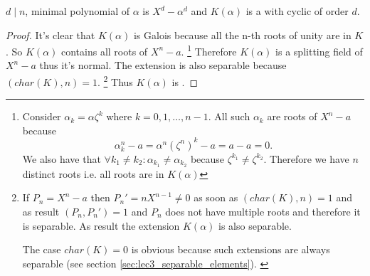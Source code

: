\begin{proposition}
  $d \mid n$, minimal polynomial of $\alpha$ is $X^d - \alpha^d$ and
  $K\left(\alpha\right)$ is a  with
  cyclic  of order $d$.
  \label{prop:lec7_1}
  \begin{proof}
    It's clear that $K\left(\alpha\right)$ is Galois because all the
    n-th roots of unity are in $K$. So $K\left(\alpha\right)$
    contains all roots of $X^n - a$.
    \footnote{
      Consider $\alpha_k = \alpha \zeta^k$ where
      $k = 0,1, \dots, n - 1$. All such $\alpha_k$ are roots of
      $X^n - a$ because
      \[
      \alpha_k^n - a = \alpha^n \left(\zeta^n\right)^k - a = a - a =0.
      \]
      We also have that $\forall k_1 \ne k_2: \alpha_{k_1} \ne
      \alpha_{k_2}$ because $\zeta^{k_1} \ne \zeta^{k_2}$. Therefore
      we have $n$ distinct roots i.e. all roots are in
      $K\left(\alpha\right)$
    }
    Therefore $K\left(\alpha\right)$
    is a splitting field of $X^n - a$ thus it's
    normal. The extension is also separable because
    $\left(char(K), n\right) = 1$.    
    \footnote{
      If $P_n = X^n - a$ then $P_n' = n X^{n-1} \ne 0$ as soon as
      $\left(char(K), n\right) = 1$ and as result $(P_n, P_n') = 1$
      and $P_n$ does not have multiple roots and therefore it is
      separable. As result the extension $K\left(\alpha\right)$ is
      also separable.

      The case $char(K) = 0$ is obvious because such extensions are
      always separable (see section
      \ref{sec:lec3_separable_elements}).
      \label{note:lec7_kummer_extension_char_zero}
    }
    Thus $K\left(\alpha\right)$ is .


\end{proof}
\end{proposition}
